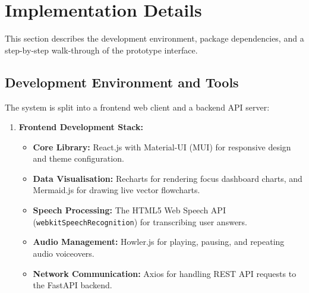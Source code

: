 \documentclass[final,5p,times,twocolumn,authoryear]{elsarticle}
\begin{document}
\section{Implementation Details}
\label{sec:implementation}

This section describes the development environment, package dependencies, and a step-by-step walk-through of the prototype interface.

\subsection{Development Environment and Tools}
\label{subsec:dev_environment}

The system is split into a frontend web client and a backend API server:
\begin{enumerate}
    \item \textbf{Frontend Development Stack:} 
    \begin{itemize}
        \item \textbf{Core Library:} React.js with Material-UI (MUI) for responsive design and theme configuration.
        \item \textbf{Data Visualisation:} Recharts for rendering focus dashboard charts, and Mermaid.js for drawing live vector flowcharts.
        \item \textbf{Speech Processing:} The HTML5 Web Speech API (\texttt{webkitSpeechRecognition}) for transcribing user answers.
        \item \textbf{Audio Management:} Howler.js for playing, pausing, and repeating audio voiceovers.
        \item \textbf{Network Communication:} Axios for handling REST API requests to the FastAPI backend.
    \end{itemize}
    

\end{enumerate}
\end{document}
